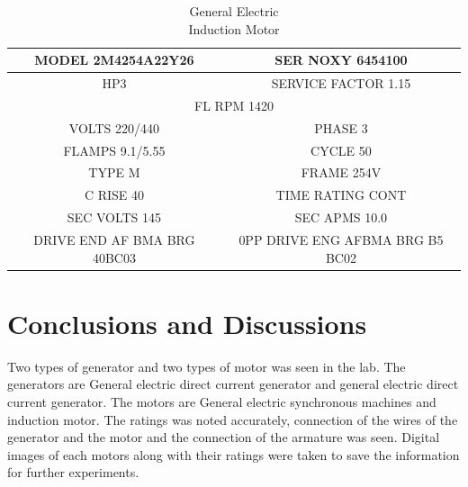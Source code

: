 \begin{table}[hbt!]
  \centering

  \label{tab3}
  \begin{tabular}{|cc|}
    \hline
    \multicolumn{1}{|c|}{MODEL 2M4254A22Y26}          & SER NOXY 6454100                \\ \hline
    \multicolumn{1}{|c|}{HP3}                         & SERVICE FACTOR 1.15             \\ \hline
    \multicolumn{2}{|c|}{FL RPM 1420}                                                   \\ \hline
    \multicolumn{1}{|c|}{VOLTS 220/440}               & PHASE 3                         \\ \hline
    \multicolumn{1}{|c|}{FLAMPS 9.1/5.55}             & CYCLE 50                        \\ \hline
    \multicolumn{1}{|c|}{TYPE M}                      & FRAME 254V                      \\ \hline
    \multicolumn{1}{|c|}{C RISE 40}                   & TIME RATING CONT                \\ \hline
    \multicolumn{1}{|c|}{SEC VOLTS 145}               & SEC APMS 10.0                   \\ \hline
    \multicolumn{1}{|c|}{DRIVE END AF BMA BRG 40BC03} & 0PP DRIVE ENG AFBMA BRG B5 BC02 \\ \hline
  \end{tabular}
  \caption{General Electric\\
    Induction Motor}
\end{table}
\section{Conclusions and Discussions}
Two types of generator and two types of motor was seen in the lab. The generators are General electric direct current generator and general electric direct current generator. The motors are General electric synchronous machines and induction motor. The ratings was noted accurately, connection of the wires of the generator and the motor and the connection of the armature was seen. Digital images of each motors along with their ratings were taken to save the information for further experiments.
\newpage








